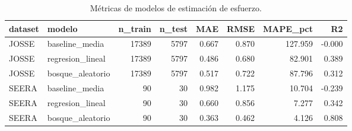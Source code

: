 \begin{table}
\caption{Métricas de modelos de estimación de esfuerzo.}
\label{tab:model_metrics}
\begin{tabular}{llrrrrrr}
\toprule
dataset & modelo & n_train & n_test & MAE & RMSE & MAPE_pct & R2 \\
\midrule
JOSSE & baseline_media & 17389 & 5797 & 0.667 & 0.870 & 127.959 & -0.000 \\
JOSSE & regresion_lineal & 17389 & 5797 & 0.486 & 0.680 & 82.901 & 0.389 \\
JOSSE & bosque_aleatorio & 17389 & 5797 & 0.517 & 0.722 & 87.796 & 0.312 \\
SEERA & baseline_media & 90 & 30 & 0.982 & 1.175 & 10.704 & -0.239 \\
SEERA & regresion_lineal & 90 & 30 & 0.660 & 0.856 & 7.277 & 0.342 \\
SEERA & bosque_aleatorio & 90 & 30 & 0.363 & 0.462 & 4.126 & 0.808 \\
\bottomrule
\end{tabular}
\end{table}
